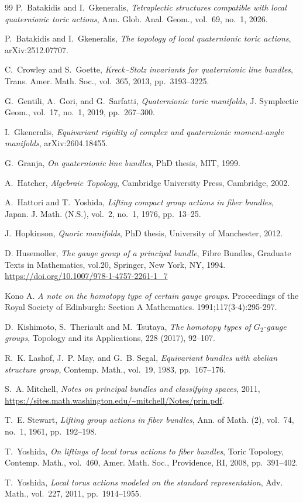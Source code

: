 \documentclass[11pt,a4paper]{article}
\numberwithin{equation}{section}
\theoremstyle{named}
\begin{document}
\begin{thebibliography}{99}
P.~Batakidis and I.~Gkeneralis, \emph{Tetraplectic structures compatible with local quaternionic toric actions}, Ann. Glob. Anal. Geom., vol.~69, no.~1, 2026.

P.~Batakidis and I.~Gkeneralis, \emph{The topology of local quaternionic toric actions}, arXiv:2512.07707.

C.~Crowley and S.~Goette, \emph{Kreck--Stolz invariants for quaternionic line bundles}, Trans. Amer. Math. Soc., vol.~365, 2013, pp.~3193--3225.

G.~Gentili, A.~Gori, and G.~Sarfatti, \emph{Quaternionic toric manifolds}, J. Symplectic Geom., vol.~17, no.~1, 2019, pp.~267--300.

I.~Gkeneralis, \emph{Equivariant rigidity of complex and quaternionic moment-angle manifolds}, arXiv:2604.18455.

G.~Granja, \emph{On quaternionic line bundles}, PhD thesis, MIT, 1999.

A.~Hatcher, \emph{Algebraic Topology}, Cambridge University Press, Cambridge, 2002.

A.~Hattori and T.~Yoshida, \emph{Lifting compact group actions in fiber bundles}, Japan. J. Math. (N.S.), vol.~2, no.~1, 1976, pp.~13--25.

J.~Hopkinson, \emph{Quoric manifolds}, PhD thesis, University of Manchester, 2012.

D. Husemoller, \emph{The gauge group of a principal bundle}, Fibre Bundles, Graduate Texts in Mathematics, vol.20, Springer, New York, NY, 1994. 
\url{https://doi.org/10.1007/978-1-4757-2261-1_7}

Kono A. \emph{A note on the homotopy type of certain gauge groups}. Proceedings of the Royal Society of Edinburgh: Section A Mathematics. 1991;117(3-4):295-297.

D.~Kishimoto, S.~Theriault and M.~Tsutaya, \emph{The homotopy types of \(G_2\)-gauge groups}, Topology and its Applications, 228 (2017), 92--107.

R.~K. Lashof, J.~P. May, and G.~B. Segal, \emph{Equivariant bundles with abelian structure group}, Contemp. Math., vol.~19, 1983, pp.~167--176.

S.~A. Mitchell, \emph{Notes on principal bundles and classifying spaces}, 2011, \url{https://sites.math.washington.edu/~mitchell/Notes/prin.pdf}.

T.~E. Stewart, \emph{Lifting group actions in fiber bundles}, Ann. of Math. (2), vol.~74, no.~1, 1961, pp.~192--198.

T.~Yoshida, \emph{On liftings of local torus actions to fiber bundles}, Toric Topology, Contemp. Math., vol.~460, Amer. Math. Soc., Providence, RI, 2008, pp.~391--402.

T.~Yoshida, \emph{Local torus actions modeled on the standard representation}, Adv. Math., vol.~227, 2011, pp.~1914--1955.
\end{thebibliography}
\end{document}
